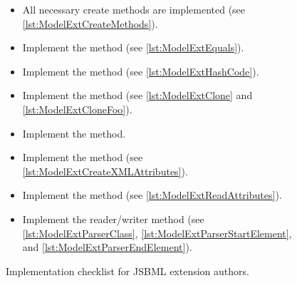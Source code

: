 \begin{figure}[htb]
\begin{framed}
\begin{itemize}[label=$\Box$,leftmargin=2em]
\begin{itemize}[label=$\Box$]
      \item {}
        
      \item {}
        
      \item {}
        
      \item {}
        
      \item {}
      
      \item {}

      \end{itemize}

    \item All necessary create methods are implemented (see 
      \vref{lst:ModelExtCreateMethods}).

    \item Implement the  method (see 
      \vref{lst:ModelExtEquals}).

    \item Implement the  method (see 
      \vref{lst:ModelExtHashCode}).

    \item Implement the  method (see 
      \vref{lst:ModelExtClone} and \vref{lst:ModelExtCloneFoo}).

    \item Implement the  method.

    \item Implement the  method (see 
      \vref{lst:ModelExtCreateXMLAttributes}).

	\item Implement the  method (see 
      \vref{lst:ModelExtReadAttributes}).
      
    \item Implement the reader/writer method (see 
      \vref{lst:ModelExtParserClass},
      \vref{lst:ModelExtParserStartElement}, and
      \vref{lst:ModelExtParserEndElement}).
    \end{itemize}
  \end{framed}
  \caption{Implementation checklist for JSBML extension authors.}
  \label{fig:checklist}
\end{figure}


